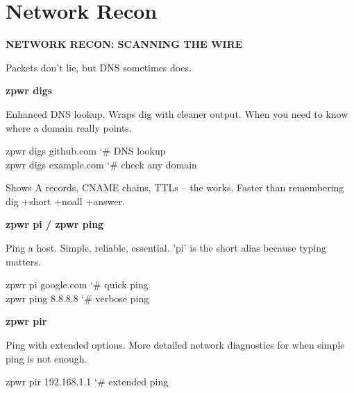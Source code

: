\documentclass[11pt,a4paper,twoside]{book}
\begin{document}
\section{Network Recon}


\vspace{10pt}
{\large\bfseries\color{neoncyan} NETWORK RECON: SCANNING THE WIRE}\vspace{6pt}

Packets don't lie, but DNS sometimes does.


\vspace{12pt}
{\bfseries\color{neonyellow} zpwr digs}\vspace{4pt}

Enhanced DNS lookup. Wraps dig with cleaner output. When you need to know where a domain really points.

\begin{codebox}
\color{neongreen}zpwr digs github.com         {\char`\#} DNS lookup\\
\color{neongreen}zpwr digs example.com        {\char`\#} check any domain\\
\end{codebox}

Shows A records, CNAME chains, TTLs -- the works. Faster than remembering dig +short +noall +answer.


\vspace{12pt}
{\bfseries\color{neonyellow} zpwr pi / zpwr ping}\vspace{4pt}

Ping a host. Simple, reliable, essential. 'pi' is the short alias because typing matters.

\begin{codebox}
\color{neongreen}zpwr pi google.com           {\char`\#} quick ping\\
\color{neongreen}zpwr ping 8.8.8.8           {\char`\#} verbose ping\\
\end{codebox}


\vspace{12pt}
{\bfseries\color{neonyellow} zpwr pir}\vspace{4pt}

Ping with extended options. More detailed network diagnostics for when simple ping is not enough.

\begin{codebox}
\color{neongreen}zpwr pir 192.168.1.1        {\char`\#} extended ping\\
\end{codebox}
\end{document}
